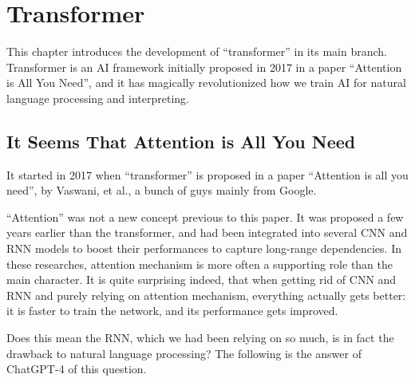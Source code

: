 \chapter{Transformer} \label{ch:transformer}

This chapter introduces the development of ``transformer'' in its main branch. Transformer is an AI framework initially proposed in 2017 in a paper ``Attention is All You Need'', and it has magically revolutionized how we train AI for natural language processing and interpreting.

\section{It Seems That Attention is All You Need}

It started in 2017 when ``transformer'' is proposed in a paper ``Attention is all you need'', by Vaswani, et al., a bunch of guys mainly from Google.

``Attention'' was not a new concept previous to this paper. It was proposed a few years earlier than the transformer, and had been integrated into several CNN and RNN models to boost their performances to capture long-range dependencies. In these researches, attention mechanism is more often a supporting role than the main character. It is quite surprising indeed, that when getting rid of CNN and RNN and purely relying on attention mechanism, everything actually gets better: it is faster to train the network, and its performance gets improved.

Does this mean the RNN, which we had been relying on so much, is in fact the drawback to natural language processing? The following is the answer of ChatGPT-4 of this question.

